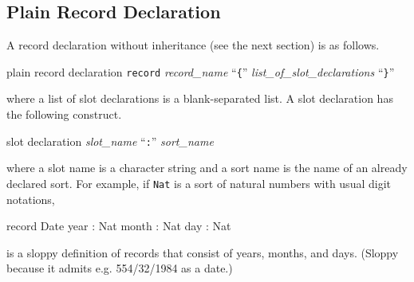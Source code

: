 \documentclass[a4paper]{memoir}
\begin{document}
\subsection{Plain Record Declaration}\label{sec:p2-plain-record-decl}

A record declaration without inheritance (see the next section) is as
follows.

\begin{bsyntax} plain record declaration  \Hline
\texttt{record} \textit{record\_name} ``\texttt{\{}'' \textit{list\_of\_slot\_declarations} ``\texttt{\}}''
\end{bsyntax}

where a list of slot declarations is a blank-separated list.
A slot declaration has the following construct.

\begin{bsyntax} slot declaration \Hline
\textit{slot\_name} ``\texttt{:}'' \textit{sort\_name}
\end{bsyntax}

where a slot name is a character string and a sort name is
the name of an already declared sort. For example, if \verb|Nat|
is a sort of natural numbers with usual digit notations,
\begin{vvtm}
\begin{ccode}
  record Date {
    year  : Nat
    month : Nat
    day   : Nat
  }
\end{ccode}
\end{vvtm}
is a sloppy definition of records that consist of years, months, and days.
(Sloppy because it admits e.g. 554/32/1984 as a date.)
\end{document}
